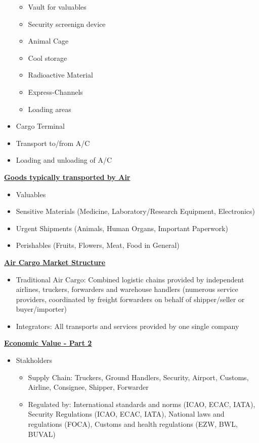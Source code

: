\documentclass[9pt, landscape, fleqn]{scrartcl}
\begin{document}
\begin{multicols*}{3}
\begin{itemize}
    \begin{itemize}
        \item Vault for valuables 
        \item Security screenign device 
        \item Animal Cage 
        \item Cool storage 
        \item Radioactive Material 
        \item Express-Channels 
        \item Loading areas 
    \end{itemize}
    \item Cargo Terminal 
    \item Transport to/from A/C 
    \item Loading and unloading of A/C 
\end{itemize}
\underline{\textbf{Goods typically transported by Air}}
\begin{itemize}
    \item Valuables 
    \item Sensitive Materials (Medicine, Laboratory/Research Equipment, Electronics)
    \item Urgent Shipments (Animals, Human Organs, Important Paperwork)
    \item Perishables (Fruits, Flowers, Meat, Food in General)
\end{itemize}
\underline{\textbf{Air Cargo Market Structure}}
\begin{itemize}
    \item Traditional Air Cargo: Combined logistic chains provided by independent airlines, truckers, forwarders and warehouse handlers (numerous service providers, coordinated by freight forwarders on behalf of shipper/seller or buyer/importer)
    \item Integrators: All transports and services provided by one single company
\end{itemize}
\underline{\textbf{Economic Value - Part 2}}
\begin{itemize}
    \item Stakholders 
    \begin{itemize}
        \item Supply Chain: Truckers, Ground Handlers, Security, Airport, Customs, Airline, Consignee, Shipper, Forwarder 
        \item Regulated by: International standards and norms (ICAO, ECAC, IATA), Security Regulations (ICAO, ECAC, IATA), National laws and regulations (FOCA), Customs and health regulations (EZW, BWL, BUVAL)

\end{itemize}
\end{itemize}
\end{multicols*}
\end{document}
